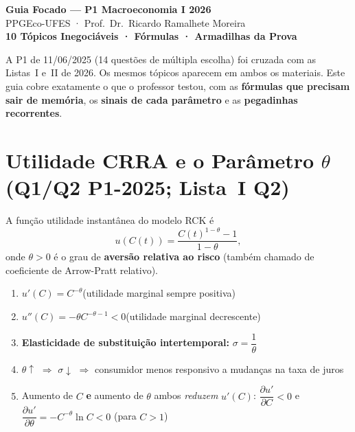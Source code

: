 \documentclass[12pt, a4paper]{article}
\begin{document}
\begin{center}
  {\LARGE\bfseries\color{azul} Guia Focado --- P1 Macroeconomia I 2026}\\[0.4em]
  {\large\color{cinza} PPGEco-UFES · Prof.\ Dr.\ Ricardo Ramalhete Moreira}\\[0.3em]
  {\normalsize\color{laranja}\bfseries 10 Tópicos Inegociáveis · Fórmulas · Armadilhas da Prova}
\end{center}

\vspace{0.3em}
\begin{provabox}[title={Metodologia: como este guia foi construído}]
A P1 de 11/06/2025 (14 questões de múltipla escolha) foi cruzada com as Listas~I e~II de 2026. Os mesmos tópicos aparecem em ambos os materiais. Este guia cobre exatamente o que o professor testou, com as \textbf{fórmulas que precisam sair de memória}, os \textbf{sinais de cada parâmetro} e as \textbf{pegadinhas recorrentes}.
\end{provabox}

\tableofcontents
\newpage

\section{Utilidade CRRA e o Parâmetro $\theta$ (Q1/Q2 P1-2025; Lista~I Q2)}

A função utilidade instantânea do modelo RCK é
\[
  u\!\left(C(t)\right) = \frac{C(t)^{1-\theta}-1}{1-\theta},
\]
onde $\theta > 0$ é o grau de \textbf{aversão relativa ao risco} (também chamado de coeficiente de Arrow-Pratt relativo).

\begin{formulabox}[title={Fatos que precisam sair de cor}]
\begin{enumerate}[leftmargin=*,label=\textbf{\arabic*.}]
  \item $u'(C) = C^{-\theta}$\quad (utilidade marginal sempre positiva)
  \item $u''(C) = -\theta C^{-\theta-1} < 0$\quad (utilidade marginal decrescente)
  \item \textbf{Elasticidade de substituição intertemporal:}\; $\sigma = \dfrac{1}{\theta}$
  \item $\theta\uparrow$ $\Rightarrow$ $\sigma\downarrow$ $\Rightarrow$ consumidor menos responsivo a mudanças na taxa de juros
  \item Aumento de $C$ \textbf{e} aumento de $\theta$ ambos \emph{reduzem} $u'(C)$: $\dfrac{\partial u'}{\partial C} < 0$ e $\dfrac{\partial u'}{\partial\theta} = -C^{-\theta}\ln C < 0$ (para $C>1$)
\end{enumerate}
\end{formulabox}
\end{document}
